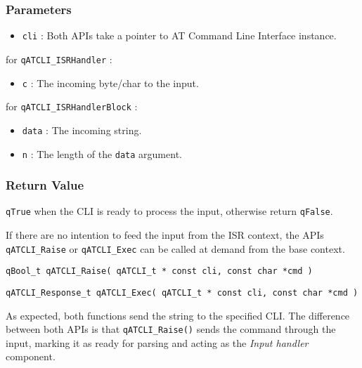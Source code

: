 \subsubsection*{Parameters}
\begin{itemize}
    \item \lstinline{cli} : Both APIs take a pointer to AT Command Line Interface instance.
\end{itemize}

for \lstinline{qATCLI_ISRHandler} :
\begin{itemize}
    \item \lstinline{c} : The incoming byte/char to the input. 
\end{itemize}

for \lstinline{qATCLI_ISRHandlerBlock} :
\begin{itemize}
    \item \lstinline{data} : The incoming string.
    \item \lstinline{n} : The length of the \lstinline{data} argument.
\end{itemize}

\subsubsection*{Return Value}
\lstinline{qTrue} when the CLI is ready to process the input, otherwise return \lstinline{qFalse}.

\noindent\hrulefill
\newline
If there are no intention to feed the input from the ISR context, the APIs \lstinline{qATCLI_Raise}  or \lstinline{qATCLI_Exec}  can be called at demand from the base context.
\medskip

\begin{lstlisting}[style=CStyle]
qBool_t qATCLI_Raise( qATCLI_t * const cli, const char *cmd )
\end{lstlisting}

\begin{lstlisting}[style=CStyle]
qATCLI_Response_t qATCLI_Exec( qATCLI_t * const cli, const char *cmd )
\end{lstlisting}

As expected, both functions send the string to the specified CLI.
The difference between both APIs is that \lstinline{qATCLI_Raise()} sends the command through the input, marking it as ready for parsing and acting as the \textit{Input handler} component.

